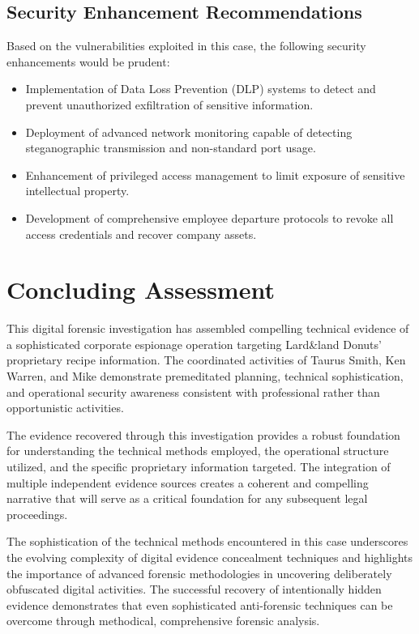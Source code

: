 \subsection{Security Enhancement Recommendations}
Based on the vulnerabilities exploited in this case, the following security enhancements would be prudent:

\begin{itemize}
    \item Implementation of Data Loss Prevention (DLP) systems to detect and prevent unauthorized exfiltration of sensitive information.
    
    \item Deployment of advanced network monitoring capable of detecting steganographic transmission and non-standard port usage.
    
    \item Enhancement of privileged access management to limit exposure of sensitive intellectual property.
    
    \item Development of comprehensive employee departure protocols to revoke all access credentials and recover company assets.
\end{itemize}

\section{Concluding Assessment}
This digital forensic investigation has assembled compelling technical evidence of a sophisticated corporate espionage operation targeting Lard\&land Donuts' proprietary recipe information. The coordinated activities of Taurus Smith, Ken Warren, and Mike demonstrate premeditated planning, technical sophistication, and operational security awareness consistent with professional rather than opportunistic activities.

The evidence recovered through this investigation provides a robust foundation for understanding the technical methods employed, the operational structure utilized, and the specific proprietary information targeted. The integration of multiple independent evidence sources creates a coherent and compelling narrative that will serve as a critical foundation for any subsequent legal proceedings.

The sophistication of the technical methods encountered in this case underscores the evolving complexity of digital evidence concealment techniques and highlights the importance of advanced forensic methodologies in uncovering deliberately obfuscated digital activities. The successful recovery of intentionally hidden evidence demonstrates that even sophisticated anti-forensic techniques can be overcome through methodical, comprehensive forensic analysis.